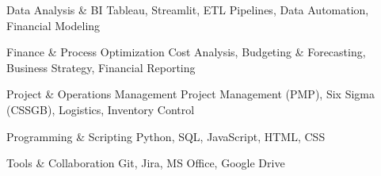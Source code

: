 

\begin{cvskills}

\cvskill
    {Data Analysis \& BI} %
    {Tableau, Streamlit, ETL Pipelines, Data Automation, Financial Modeling} %

\cvskill
    {Finance \& Process Optimization} %
    {Cost Analysis, Budgeting \& Forecasting, Business Strategy, Financial Reporting} %

\cvskill
    {Project \& Operations Management} %
    {Project Management (PMP), Six Sigma (CSSGB), Logistics, Inventory Control} %

\cvskill
    {Programming \& Scripting} %
    {Python, SQL, JavaScript, HTML, CSS} %

\cvskill
    {Tools \& Collaboration} %
    {Git, Jira, MS Office, Google Drive} %


\end{cvskills}